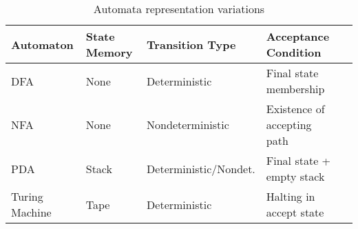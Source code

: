 \begin{table}[htbp]
    \centering
      \begin{tabular}{@{}lllll@{}}
          \toprule
          \textbf{Automaton} & \textbf{State Memory} & \textbf{Transition Type} & \textbf{Acceptance Condition} \\ \midrule
          DFA & None & Deterministic & Final state membership \cite{hopcroft2006introduction} \\
          NFA & None & Nondeterministic & Existence of accepting path \cite{hopcroft2006introduction} \\
          PDA & Stack & Deterministic/Nondet. & Final state + empty stack \cite{chomsky1956three} \\
          Turing Machine & Tape & Deterministic & Halting in accept state \cite{turing1936computable} \\
          \bottomrule
      \end{tabular}%
    \caption{Automata representation variations}
    \label{tab:automata-variations}
\end{table}